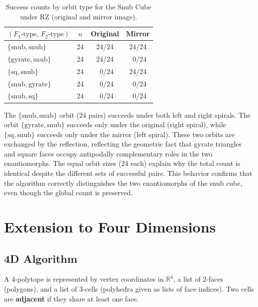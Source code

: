 \documentclass[12pt]{article}
\theoremstyle{definition}
\begin{document}
\begin{table}[ht]
\centering
\caption{Success counts by orbit type for the Snub Cube under RZ
  (original and mirror image).}
\label{tab:snub-orbits}
\renewcommand{\arraystretch}{1.15}
\begin{tabular}{lccc}
\toprule
$(F_1\text{-type},\,F_2\text{-type})$ & $n$ & Original & Mirror \\
\midrule
$\{\mathrm{snub},\mathrm{snub}\}$   & 24 & 24/24 & 24/24 \\
$\{\mathrm{gyrate},\mathrm{snub}\}$ & 24 & 24/24 & \ 0/24 \\
$\{\mathrm{sq},\mathrm{snub}\}$     & 24 & \ 0/24 & 24/24 \\
$\{\mathrm{snub},\mathrm{gyrate}\}$ & 24 & \ 0/24 & \ 0/24 \\
$\{\mathrm{snub},\mathrm{sq}\}$     & 24 & \ 0/24 & \ 0/24 \\
\bottomrule
\end{tabular}
\end{table}

The $\{\mathrm{snub},\mathrm{snub}\}$ orbit (24 pairs) succeeds under
both left and right spirals.
The orbit $\{\mathrm{gyrate},\mathrm{snub}\}$ succeeds only under the
original (right spiral), while $\{\mathrm{sq},\mathrm{snub}\}$
succeeds only under the mirror (left spiral).
These two orbits are exchanged by the reflection, reflecting the
geometric fact that gyrate triangles and square faces occupy
antipodally complementary roles in the two enantiomorphs.
The equal orbit sizes (24 each) explain why the total count is identical
despite the different sets of successful pairs.
This behavior confirms that the algorithm correctly distinguishes the two
enantiomorphs of the snub cube, even though the global count is preserved.

\clearpage
\section{Extension to Four Dimensions}
\label{sec:4d}

\subsection{4D Algorithm}

A 4-polytope is represented by vertex coordinates in $\mathbb{R}^4$,
a list of 2-faces (polygons), and a list of 3-cells
(polyhedra given as lists of face indices).
Two cells are \textbf{adjacent} if they share at least one face.
\end{document}

